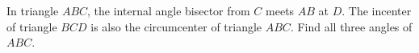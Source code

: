 In triangle $ABC$, the internal angle bisector from $C$ meets $AB$ at $D$. The incenter of triangle $BCD$ is also the circumcenter of triangle $ABC$. Find all three angles of $ABC$.
